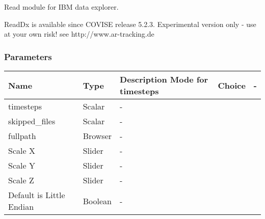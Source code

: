 \begin{htmlonly}
%
Read module for IBM data explorer.

%


%
%
ReadDx is available since COVISE release 5.2.3. 
Experimental version only - use at your own risk!
see \latexonly http://www.ar-tracking.de \endlatexonly
\begin{htmlonly}
\end{htmlonly}

\subsubsection{Parameters}
%

 
\begin{longtable}{|p{4.5cm}|p{2cm}|p{6.5cm}|}
\hline
   \bf{Name} & \bf{Type} & \bf{Description} \endhead
\hline\hline
	Mode for timesteps  & Choice  & - \\ 
\hline
	timesteps           & Scalar  & - \\
\hline
	skipped\_files      & Scalar  & - \\
\hline
	fullpath            & Browser & - \\
\hline
	Scale X             & Slider  & - \\ 	
\hline
	Scale Y             & Slider  & - \\
\hline
	Scale Z             & Slider  & - \\
\hline
	Default is \newline 
	Little Endian       & Boolean & - \\ 	 	
\hline	 		
\end{longtable}







\end{htmlonly}
